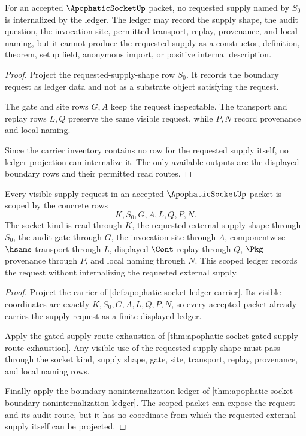 \begin{theorem}
\label{thm:apophatic-socket-boundary-noninternalization-ledger}
For an accepted $\ApophaticSocketUp$ packet, no requested supply named by $S_0$ is internalized by the ledger. The ledger may record the supply shape, the audit question, the invocation site, permitted transport, replay, provenance, and local naming, but it cannot produce the requested supply as a constructor, definition, theorem, setup field, anonymous import, or positive internal description.
\end{theorem}
\begin{proof}
Project the requested-supply-shape row $S_0$. It records the boundary request as ledger data and not as a substrate object satisfying the request.

The gate and site rows $G,A$ keep the request inspectable. The transport and replay rows $L,Q$ preserve the same visible request, while $P,N$ record provenance and local naming.

Since the carrier inventory contains no row for the requested supply itself, no ledger projection can internalize it. The only available outputs are the displayed boundary rows and their permitted read routes.
\end{proof}

\begin{theorem}
\label{thm:apophatic-socket-scoped-supply-ledger}
Every visible supply request in an accepted $\ApophaticSocketUp$ packet is scoped by the concrete rows
$$
K,S_0,G,A,L,Q,P,N.
$$
The socket kind is read through $K$, the requested external supply shape through $S_0$, the audit gate through $G$, the invocation site through $A$, componentwise $\hsame$ transport through $L$, displayed $\Cont$ replay through $Q$, $\Pkg$ provenance through $P$, and local \NameCert{} naming through $N$. This scoped ledger records the request without internalizing the requested external supply.
\end{theorem}
\begin{proof}
Project the carrier of \autoref{def:apophatic-socket-ledger-carrier}. Its visible coordinates are exactly $K,S_0,G,A,L,Q,P,N$, so every accepted packet already carries the supply request as a finite displayed ledger.

Apply the gated supply route exhaustion of \autoref{thm:apophatic-socket-gated-supply-route-exhaustion}. Any visible use of the requested supply shape must pass through the socket kind, supply shape, gate, site, transport, replay, provenance, and local naming rows.

Finally apply the boundary noninternalization ledger of \autoref{thm:apophatic-socket-boundary-noninternalization-ledger}. The scoped packet can expose the request and its audit route, but it has no coordinate from which the requested external supply itself can be projected.
\end{proof}

